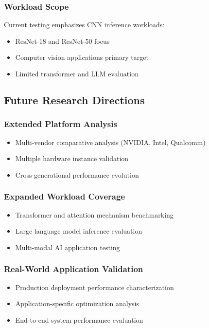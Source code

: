 \documentclass[manuscript]{acmart}
\begin{document}
\subsubsection{Workload Scope}
Current testing emphasizes CNN inference workloads:
\begin{itemize}
    \item ResNet-18 and ResNet-50 focus
    \item Computer vision applications primary target
    \item Limited transformer and LLM evaluation
\end{itemize}

\subsection{Future Research Directions}

\subsubsection{Extended Platform Analysis}
\begin{itemize}
    \item Multi-vendor comparative analysis (NVIDIA, Intel, Qualcomm)
    \item Multiple hardware instance validation
    \item Cross-generational performance evolution
\end{itemize}

\subsubsection{Expanded Workload Coverage}
\begin{itemize}
    \item Transformer and attention mechanism benchmarking
    \item Large language model inference evaluation
    \item Multi-modal AI application testing
\end{itemize}

\subsubsection{Real-World Application Validation}
\begin{itemize}
    \item Production deployment performance characterization
    \item Application-specific optimization analysis
    \item End-to-end system performance evaluation
\end{itemize}
\end{document}
